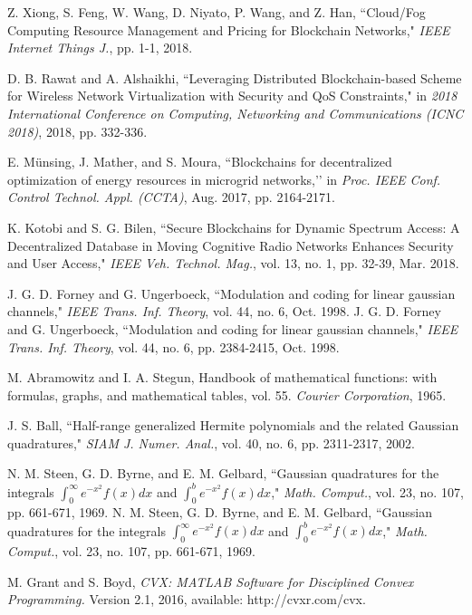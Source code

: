 \documentclass[journal]{IEEEtran}
\begin{document}
\begin{IEEEkeywords}
\begin{thebibliography}{1}
Z. Xiong, S. Feng, W. Wang, D. Niyato, P. Wang, and Z. Han, ``Cloud/Fog Computing Resource Management and Pricing for Blockchain Networks," \emph{IEEE Internet Things J.}, pp. 1-1, 2018.

D. B. Rawat and A. Alshaikhi, ``Leveraging Distributed Blockchain-based Scheme for Wireless Network Virtualization with Security and QoS Constraints," in \emph{2018 International Conference on Computing, Networking and Communications (ICNC 2018)}, 2018, pp. 332-336.

E. M\"{u}nsing, J. Mather, and S. Moura, ``Blockchains for decentralized optimization of energy resources in microgrid networks,’’ in \emph{Proc. IEEE
Conf. Control Technol. Appl. (CCTA)}, Aug. 2017, pp. 2164-2171.

K. Kotobi and S. G. Bilen, ``Secure Blockchains for Dynamic Spectrum Access: A Decentralized Database in Moving Cognitive Radio Networks Enhances Security and User Access," \emph{IEEE Veh. Technol. Mag.}, vol. 13, no. 1, pp. 32-39, Mar. 2018.
	
J. G. D. Forney and G. Ungerboeck, ``Modulation and coding for linear gaussian channels," \emph{IEEE Trans. Inf. Theory}, vol. 44, no. 6, Oct. 1998.
J. G. D. Forney and G. Ungerboeck, ``Modulation and coding for linear gaussian channels," \emph{IEEE Trans. Inf. Theory}, vol. 44, no. 6, pp. 2384-2415, Oct. 1998.

M. Abramowitz and I. A. Stegun, Handbook of mathematical functions: with formulas, graphs, and mathematical tables, vol. 55. \emph{Courier Corporation}, 1965.

J. S. Ball, ``Half-range generalized Hermite polynomials and the related Gaussian quadratures," \emph{SIAM J. Numer. Anal.}, vol. 40, no. 6, pp. 2311-2317, 2002.

N. M. Steen, G. D. Byrne, and E. M. Gelbard, ``Gaussian quadratures for the integrals $\int_{0}^{\infty} e^{-x^2}f\left(x\right) dx$ and $\int_{0}^{b}e^{-x^2}f\left(x\right)dx$," \emph{ Math. Comput.}, vol. 23, no. 107, pp. 661-671, 1969.
N. M. Steen, G. D. Byrne, and E. M. Gelbard, ``Gaussian quadratures for the integrals $\int_{0}^{\infty} e^{-x^2}f\left(x\right) dx$ and $\int_{0}^{b}e^{-x^2}f\left(x\right)dx$," \emph{Math. Comput.}, vol. 23, no. 107, pp. 661-671, 1969.

M. Grant and S. Boyd, \emph{CVX: MATLAB Software for Disciplined Convex Programming.} Version 2.1, 2016, available: http://cvxr.com/cvx.


\end{thebibliography}
\end{IEEEkeywords}
\end{document}

